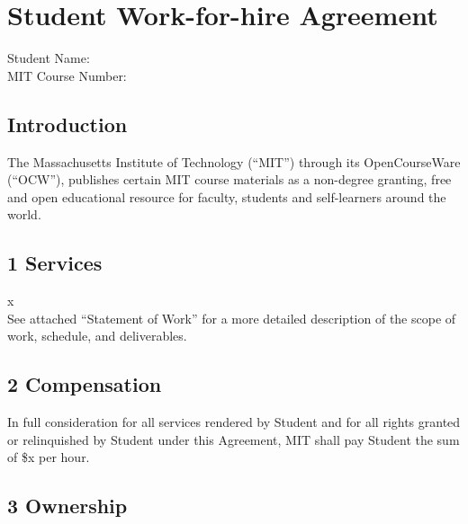 \documentclass{article}
\begin{document}
\thispagestyle{fancy}


\section*{Student Work-for-hire Agreement}
Student Name: \makebox[8cm]{\hrulefill}
\\[12pt]
MIT Course Number: \makebox[7cm]{\hrulefill}

\subsection*{Introduction}
The Massachusetts Institute of Technology (“MIT”) through its OpenCourseWare (“OCW”), publishes certain MIT course materials as a non-degree granting, free and open educational resource for faculty, students and self-learners around the world.

\vspace{0.5cm}
\subsection*{1 Services}
{x}
\\
See attached “Statement of Work” for a more detailed description of the scope of work, schedule, and deliverables.

\vspace{0.5cm}
\subsection*{2 Compensation}
In full consideration for all services rendered by Student and for all rights granted or relinquished by Student under this Agreement, MIT shall pay Student the sum of \${x} per hour.

\vspace{0.5cm}
\subsection*{3 Ownership}
\end{document}
